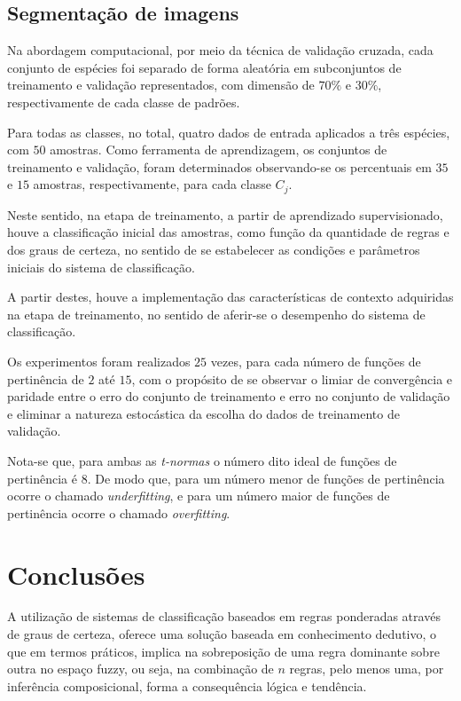 \documentclass[12pt,a4paper]{article}
\numberwithin{equation}{section}
\begin{document}
{\subsection{Segmentação de imagens}
\label{subsection:seg}

Na abordagem computacional, por meio da técnica de validação cruzada, cada conjunto de espécies foi separado de forma aleatória em subconjuntos de treinamento e validação representados, com dimensão de $70\%$ e $30\%$, respectivamente de cada classe de padrões.

Para todas as classes, no total, quatro dados de entrada aplicados a três espécies, com $50$ amostras. Como ferramenta de aprendizagem, os conjuntos de treinamento e validação, foram determinados observando-se os percentuais em $35$ e $15$ amostras, respectivamente, para cada classe $C_{j}$.

Neste sentido, na etapa de treinamento, a partir de aprendizado supervisionado, houve a classificação inicial das amostras, como função da quantidade de regras e dos graus de certeza, no sentido de se estabelecer as condições e parâmetros iniciais do sistema de classificação.

A partir destes, houve a implementação das características de contexto adquiridas na etapa de treinamento, no sentido de aferir-se o desempenho do sistema de classificação.

Os experimentos foram realizados $25$ vezes, para cada número de funções de pertinência de $2$ até $15$, com o propósito de se observar o limiar de convergência e paridade entre o erro do conjunto de treinamento e erro no conjunto de validação e eliminar a natureza estocástica da escolha do dados de treinamento de validação.

Nota-se que, para ambas as \textit{t-normas} o número dito ideal de funções de pertinência é $8$. De modo que, para um número menor de funções de pertinência ocorre o chamado \textit{underfitting}, e para um número maior de funções de pertinência ocorre o chamado \textit{overfitting}.


\newpage
\section{Conclusões}

A utilização de sistemas de classificação baseados em regras ponderadas através de graus de certeza, oferece uma solução baseada em conhecimento dedutivo, o que em termos práticos, implica na sobreposição de uma regra dominante sobre outra no espaço fuzzy, ou seja, na combinação de $n$ regras, pelo menos uma, por inferência composicional, forma a consequência lógica e tendência.

}
\end{document}
